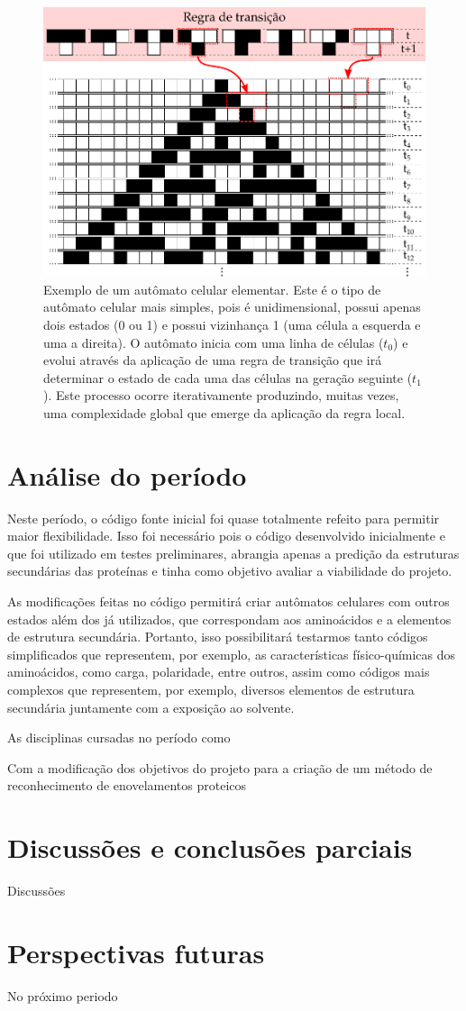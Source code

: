 \begin{figure}[h]
	\includegraphics[width=1\linewidth]{ca_final}
	\caption{Exemplo de um autômato celular elementar. Este é o tipo de autômato celular mais simples, pois é unidimensional, possui apenas dois estados (0 ou 1) e possui vizinhança 1 (uma célula a esquerda e uma a direita). O autômato inicia com uma linha de células ($t_{0}$) e evolui através da aplicação de uma regra de transição que irá determinar o estado de cada uma das células na geração seguinte ($t_{1}$). Este processo ocorre iterativamente produzindo, muitas vezes, uma complexidade global que emerge da aplicação da regra local.}
	\label{fig:ca}
\end{figure}


\section{Análise do período}
Neste período, o código fonte inicial foi quase totalmente refeito para permitir maior flexibilidade. Isso foi necessário pois o código desenvolvido inicialmente e que foi utilizado em testes preliminares, abrangia apenas a predição da estruturas secundárias das proteínas e tinha como objetivo avaliar a viabilidade do projeto. 

As modificações feitas no código permitirá criar autômatos celulares com outros estados além dos já utilizados, que correspondam aos aminoácidos e a elementos de estrutura secundária. Portanto, isso possibilitará testarmos tanto códigos simplificados que representem, por exemplo, as características físico-químicas dos aminoácidos, como carga, polaridade, entre outros, assim como códigos mais complexos que representem, por exemplo, diversos elementos de estrutura secundária juntamente com a exposição ao solvente.

As disciplinas cursadas no período como  



Com a modificação dos objetivos do projeto para a criação de um método de reconhecimento de enovelamentos proteicos
\section{Discussões e conclusões parciais}
Discussões 
\section{Perspectivas futuras}
No próximo periodo
